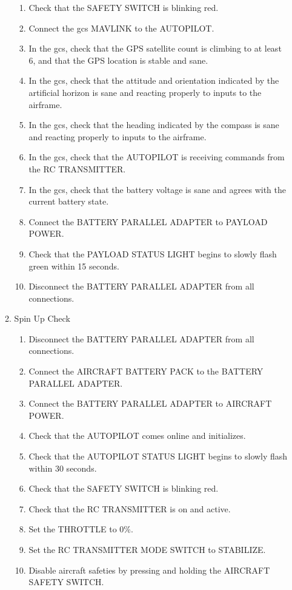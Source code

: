 \documentclass{report}
\begin{document}
\begin{enumerate}
\begin{enumerate}
\begin{enumerate}
							\item Check that the SAFETY SWITCH is blinking red.
							\item Connect the \gls{gcs} MAVLINK to the AUTOPILOT.
							\item In the \gls{gcs}, check that the GPS satellite count is climbing to at least 6, and that the GPS location is stable and sane.
							\item In the \gls{gcs}, check that the attitude and orientation indicated by the artificial horizon is sane and reacting properly to inputs to the airframe.
							\item In the \gls{gcs}, check that the heading indicated by the compass is sane and reacting properly to inputs to the airframe.
							\item In the \gls{gcs}, check that the AUTOPILOT is receiving commands from the RC TRANSMITTER.
							\item In the \gls{gcs}, check that the battery voltage is sane and agrees with the current battery state.
							\item Connect the BATTERY PARALLEL ADAPTER to PAYLOAD POWER.
							\item Check that the PAYLOAD STATUS LIGHT begins to slowly flash green within 15 seconds.
							\item Disconnect the BATTERY PARALLEL ADAPTER from all connections.
						\end{enumerate}
					\item Spin Up Check
						\begin{enumerate}
							\item Disconnect the BATTERY PARALLEL ADAPTER from all connections.
							\item Connect the AIRCRAFT BATTERY PACK to the BATTERY PARALLEL ADAPTER.
							\item Connect the BATTERY PARALLEL ADAPTER to AIRCRAFT POWER.
							\item Check that the AUTOPILOT comes online and initializes.
							\item Check that the AUTOPILOT STATUS LIGHT begins to slowly flash within 30 seconds.
							\item Check that the SAFETY SWITCH is blinking red.
							\item Check that the RC TRANSMITTER is on and active.
							\item Set the THROTTLE to 0\%.
							\item Set the RC TRANSMITTER MODE SWITCH to STABILIZE.
							\item Disable aircraft safeties by pressing and holding the AIRCRAFT SAFETY SWITCH.

\end{enumerate}
\end{enumerate}
\end{enumerate}
\end{document}
